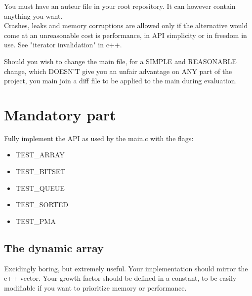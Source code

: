 \documentclass{42-en}
\begin{document}
    You must have an auteur file in your root repository. It can however contain anything you want.\\

    Crashes, leaks and memory corruptions are allowed only if the alternative would come at
    an unreasonable cost is performance, in API simplicity or in freedom in use. See "iterator
    invalidation" in c++.\\
    

    Should you wish to change the main file, for a SIMPLE and REASONABLE change,
    which DOESN'T give you an unfair advantage on ANY part of the project, you main join a diff
    file to be applied to the main during evaluation.\\



\chapter{Mandatory part}

    Fully implement the API as used by the main.c with the flags:

    \begin{itemize}\itemsep7pt
        \item TEST\_ARRAY
        \item TEST\_BITSET
        \item TEST\_QUEUE
        \item TEST\_SORTED
        \item TEST\_PMA
    \end{itemize}

    \section{The dynamic array}
    Excidingly boring, but extremely useful.
    Your implementation should mirror the c++ vector. Your growth factor should
    be defined in a constant, to be easily modifiable if you want to prioritize
    memory or performance.
\end{document}
